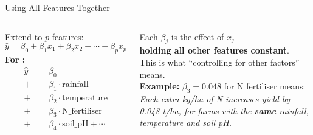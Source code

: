 \documentclass[aspectratio=169,10pt]{beamer}
\begin{document}
\begin{frame}{Using All Features Together}
  \begin{columns}
      Extend to $p$ features:
      \[
        \hat{y} = \beta_0 + \beta_1 x_1 + \beta_2 x_2 + \cdots + \beta_p x_p
      \]
      \vspace{0.1cm}
      \textbf{For \dataset{}:}
      \begin{align*}
        \hat{y} =\;& \beta_0 \\
        +\;&\beta_1 \cdot \text{rainfall} \\
        +\;&\beta_2 \cdot \text{temperature} \\
        +\;&\beta_3 \cdot \text{N\_fertiliser} \\
        +\;&\beta_4 \cdot \text{soil\_pH} + \cdots
      \end{align*}
      \begin{tcolorbox}[keybox,title={\bfseries Critical Concept}]
        \small Each $\beta_j$ is the effect of $x_j$\\
        \textbf{holding all other features constant}.\\[8pt]
        This is what ``controlling for other factors'' means.\\[8pt]
        \textbf{Example:} $\beta_3 = 0.048$ for N fertiliser means:\\
        \textit{Each extra kg/ha of N increases yield by 0.048 t/ha,
        for farms with the \textbf{same} rainfall, temperature and soil pH.}
      \end{tcolorbox}
  \end{columns}
\end{frame}
\end{document}
